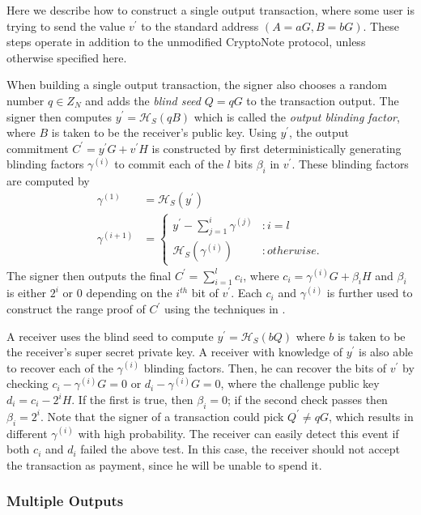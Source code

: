 \documentclass{article}
\newcommand{\oy}{\ensuremath{y^\prime}}
\newcommand{\oC}{\ensuremath{C^\prime}}
\newcommand{\ov}{\ensuremath{v^\prime}}
\newcommand{\hs}{\ensuremath{\mathcal{H}_S}}
\begin{document}
Here we describe how to construct a single output transaction, where some user
is trying to send the value {\ov} to the standard address $(A=aG, B=bG)$.  These
steps operate in addition to the unmodified CryptoNote protocol, unless
otherwise specified here.

When building a single output transaction, the signer also chooses a random
number $q \in Z_N$ and adds the {\em blind seed} $Q=qG$ to the transaction
output.  The signer then computes $\oy = \hs(qB)$ which is called the {\em
output blinding factor}, where $B$ is taken to be the receiver's public key.
Using $\oy$, the output commitment $\oC = \oy G + \ov H$ is constructed by first
deterministically generating blinding factors $\gamma^{(i)}$ to commit each of
the $l$ bits $\beta_i$ in {\ov}.  These blinding factors are computed by
\begin{align*}
  \gamma^{(1)} &= \hs(\oy) \\
  \gamma^{(i+1)} &= 
    \begin{cases}
      \oy - \sum_{j=1}^{i} \gamma^{(j)} &: i=l \\
      \hs(\gamma^{(i)}) &: otherwise.
    \end{cases}
\end{align*}
The signer then outputs the final $\oC = \sum_{i=1}^l c_i$, where $c_i =
\gamma^{(i)} G + \beta_i H$ and $\beta_i$ is either $2^i$ or 0 depending on the
$i^{th}$ bit of {\ov}.  Each $c_i$ and $\gamma^{(i)}$ is further used to
construct the range proof of $\oC$ using the techniques in \cite{MP15}.

A receiver uses the blind seed to compute $\oy = \hs(bQ)$ where $b$ is taken to
be the receiver's super secret private key.  A receiver with knowledge of $\oy$
is also able to recover each of the $\gamma^{(i)}$ blinding factors.  Then, he
can recover the bits of {\ov} by checking $c_i - \gamma^{(i)} G = 0$ or $d_i -
\gamma^{(i)} G = 0$, where the challenge public key $d_i = c_i - 2^i H$.  If the
first is true, then $\beta_i=0$; if the second check passes then $\beta_i=2^i$.
Note that the signer of a transaction could pick $Q^\prime \neq qG$, which
results in different $\gamma^{(i)}$ with high probability.  The receiver can
easily detect this event if both $c_i$ and $d_i$ failed the above test.  In this
case, the receiver should not accept the transaction as payment, since he will
be unable to spend it.

\subsubsection{Multiple Outputs}
\end{document}
